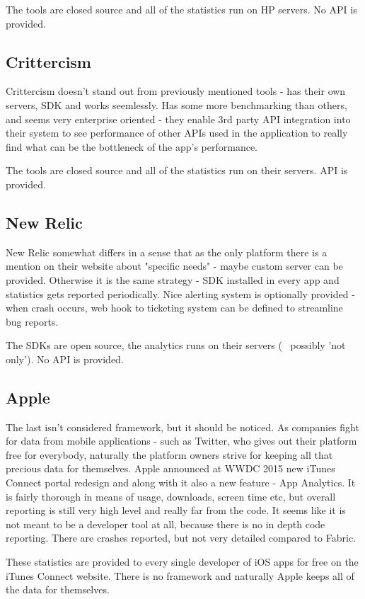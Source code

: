 The tools are closed source and all of the statistics run on HP servers. No API is provided.

\subsection{Crittercism}

Crittercism doesn't stand out from previously mentioned tools - has their own servers, SDK and works seemlessly. Has some more benchmarking than others, and seems very enterprise oriented - they enable 3rd party API integration into their system to see performance of other APIs used in the application to really find what can be the bottleneck of the app's performance.

The tools are closed source and all of the statistics run on their servers. API is provided.

\subsection{New Relic}

New Relic somewhat differs in a sense that as the only platform there is a mention on their website about "specific needs" - maybe custom server can be provided. Otherwise it is the same strategy - SDK installed in every app and statistics gets reported periodically. Nice alerting system is optionally provided - when crash occurs, web hook to ticketing system can be defined to streamline bug reports.

The SDKs are open source, the analytics runs on their servers (~ possibly 'not only'). No API is provided.

\subsection{Apple}

The last isn't considered framework, but it should be noticed. As companies fight for data from mobile applications - such as Twitter, who gives out their platform free for everybody, naturally the platform owners strive for keeping all that precious data for themselves. Apple announced at WWDC 2015 new iTunes Connect portal redesign and along with it also a new feature - App Analytics. It is fairly thorough in means of usage, downloads, screen time etc, but overall reporting is still very high level and really far from the code. It seems like it is not meant to be a developer tool at all, because there is no in depth code reporting. There are crashes reported, but not very detailed compared to Fabric.

These statistics are provided to every single developer of iOS apps for free on the iTunes Connect website. There is no framework and naturally Apple keeps all of the data for themselves.